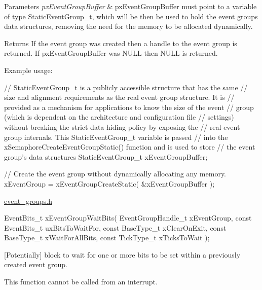 \begin{DoxyParams}{Parameters}
{\em px\+Event\+Group\+Buffer} & px\+Event\+Group\+Buffer must point to a variable of type Static\+Event\+Group\+\_\+t, which will be then be used to hold the event group\textquotesingle{}s data structures, removing the need for the memory to be allocated dynamically.\\
\hline
\end{DoxyParams}
\begin{DoxyReturn}{Returns}
If the event group was created then a handle to the event group is returned. If px\+Event\+Group\+Buffer was N\+U\+LL then N\+U\+LL is returned.
\end{DoxyReturn}
Example usage\+: 
\begin{DoxyPre}
   // StaticEventGroup\_t is a publicly accessible structure that has the same
   // size and alignment requirements as the real event group structure.  It is
   // provided as a mechanism for applications to know the size of the event
   // group (which is dependent on the architecture and configuration file
   // settings) without breaking the strict data hiding policy by exposing the
   // real event group internals.  This StaticEventGroup\_t variable is passed
   // into the xSemaphoreCreateEventGroupStatic() function and is used to store
   // the event group's data structures
   StaticEventGroup\_t xEventGroupBuffer;\end{DoxyPre}



\begin{DoxyPre}   // Create the event group without dynamically allocating any memory.
   xEventGroup = xEventGroupCreateStatic( &xEventGroupBuffer );
  \end{DoxyPre}
 \hyperlink{event__groups_8h}{event\+\_\+groups.\+h} 
\begin{DoxyPre}
   EventBits\_t xEventGroupWaitBits(     EventGroupHandle\_t xEventGroup,
                                    const EventBits\_t uxBitsToWaitFor,
                                    const BaseType\_t xClearOnExit,
                                    const BaseType\_t xWaitForAllBits,
                                    const TickType\_t xTicksToWait );
\end{DoxyPre}


\mbox{[}Potentially\mbox{]} block to wait for one or more bits to be set within a previously created event group.

This function cannot be called from an interrupt.


